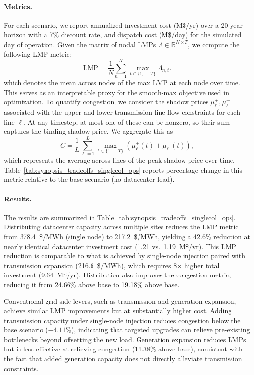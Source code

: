 \paragraph{Metrics.}
For each scenario, we report annualized investment cost (M\$/yr) over a 20-year horizon with a 7\% discount rate, and dispatch cost (M\$/day) for the simulated day of operation. Given the matrix of nodal LMPs $\Lambda \in \mathbb{R}^{N \times T}$, we compute the following LMP metric: 
\begin{equation}
\mathrm{LMP} = \frac{1}{N}\sum_{n=1}^{N}\max_{t\in\{1,\dots,T\}} \Lambda_{n,t}.
\end{equation}
which denotes the mean across nodes of the max LMP at each node over time. This serves as an interpretable proxy for the smooth-max objective used in optimization. To quantify congestion, we consider the shadow prices $\mu_\ell^+, \mu_\ell^-$ associated with the upper and lower transmission line flow constraints for each line $\ell$. At any timestep, at most one of these can be nonzero, so their sum captures the binding shadow price. We aggregate this as
\begin{equation}
    C = \frac{1}{L} \sum_{\ell=1}^{L} \max_{t \in \{1,\ldots,T\}} \left( \mu_\ell^+(t) + \mu_\ell^-(t) \right),
\end{equation}
which represents the average across lines of the peak shadow price over time. Table~\ref{tab:synopsis_tradeoffs_singlecol_ops} reports percentage change in this metric relative to the base scenario (no datacenter load).

\paragraph{Results.}
The results are summarized in Table~\ref{tab:synopsis_tradeoffs_singlecol_ops}. Distributing datacenter capacity across multiple sites reduces the LMP metric from 378.4~\$/MWh (single node) to 217.2~\$/MWh, yielding a 42.6\% reduction at nearly identical datacenter investment cost (1.21 vs.\ 1.19~M\$/yr). This LMP reduction is comparable to what is achieved by single-node injection paired with transmission expansion (216.6~\$/MWh), which requires 8$\times$ higher total investment (9.64~M\$/yr). Distribution also improves the congestion metric, reducing it from 24.66\% above base to 19.18\% above base.

Conventional grid-side levers, such as transmission and generation expansion, achieve similar LMP improvements but at substantially higher cost. Adding transmission capacity under single-node injection reduces congestion below the base scenario ($-4.11$\%), indicating that targeted upgrades can relieve pre-existing bottlenecks beyond offsetting the new load. Generation expansion reduces LMPs but is less effective at relieving congestion (14.38\% above base), consistent with the fact that added generation capacity does not directly alleviate transmission constraints.

